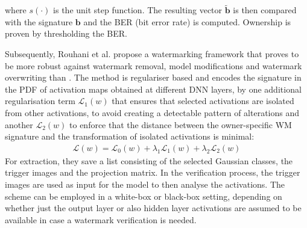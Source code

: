 where $s(\cdot)$ is the unit step function. The resulting vector $\mathbf{\tilde b}$ is then compared with the signature $\mathbf{b}$ and the BER (bit error rate) is computed. Ownership is proven by thresholding the BER. 

Subsequently, Rouhani et al. \cite{rouhani_deepsigns_2019} propose a watermarking framework that proves to be more robust against watermark removal, model modifications and watermark overwriting than \cite{uchida_embedding_2017}.
The method is regulariser based and encodes the signature in the PDF of activation maps obtained at different DNN layers, by
one additional regularisation term $\mathcal{L}_1(w)$ that ensures that selected activations are isolated from other activations, to avoid creating a detectable pattern of alterations and another $\mathcal{L}_2(w)$ to enforce that the distance between the owner-specific WM signature and the transformation of isolated activations is minimal:
\begin{align}
    \mathcal{L}(w) = \mathcal{L}_0(w) + \lambda_1 \mathcal{L}_1(w) + \lambda_2 \mathcal{L}_2(w)
 \end{align}
For extraction, they save a list consisting of the selected Gaussian classes, the trigger images and the projection matrix. In the verification process, the trigger images are used as input for the model to then analyse the activations. The scheme can be employed in a white-box or black-box setting, depending on whether just the output layer or also hidden layer activations are assumed to be available in case a watermark verification is needed.

